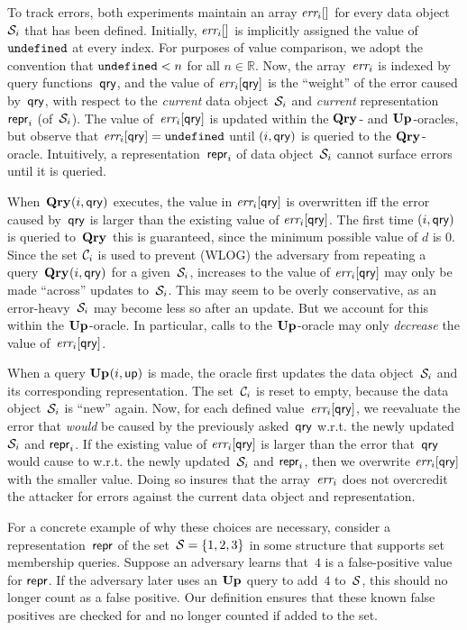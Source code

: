 To track errors, both experiments maintain an array $\textit{err}_i[]$ for every data object~$\mathcal{S}_i$ that has been defined.   Initially, $\textit{err}_i[]$ is implicitly assigned the value of~$\mathtt{undefined}$ at every index.  For purposes of value comparison, we adopt the convention that $\mathtt{undefined} < n$ for all $n \in \mathbb{R}$.
%
Now, the array~$\textit{err}_i$ is indexed by query functions~$\mathsf{qry}$, and the value of $\textit{err}_i[\mathsf{qry}]$ is the ``weight'' of the error caused by~$\mathsf{qry}$, with respect to the \emph{current} data object~$\mathcal{S}_i$ and \emph{current} representation~$\mathsf{repr}_i$ (of~$\mathcal{S}_i$).  
%
The value of~$\textit{err}_i[\mathsf{qry}]$ is updated within the $\mathbf{Qry}\hspace{0.5pt}$- and $\mathbf{Up}\hspace{0.5pt}$-oracles, but observe that $\textit{err}_i[\mathsf{qry}] = \mathtt{undefined}$ until $(i,\mathsf{qry})$ is queried to the $\mathbf{Qry}\hspace{0.5pt}$-oracle.  Intuitively, a representation~$\mathsf{repr}_i$ of data object~$\mathcal{S}_i$ cannot surface errors until it is queried.

When~$\mathbf{Qry}\hspace{0.5pt}(i,\mathsf{qry})$ executes, the value in $\textit{err}_i[\mathsf{qry}]$ is overwritten iff the error caused by~$\mathsf{qry}$ is larger than the existing value of $\textit{err}_i[\mathsf{qry}]$.  The first time $(i,\mathsf{qry})$ is queried to~$\mathbf{Qry}\hspace{0.5pt}$ this is guaranteed, since the minimum possible value of $d$ is 0.  Since the set $\mathcal{C}_i$ is used to prevent (WLOG) the adversary from repeating a query~$\mathbf{Qry}\hspace{0.5pt}(i,\mathsf{qry})$ for a given~$\mathcal{S}_i$, increases to the value of $\textit{err}_i[\mathsf{qry}]$ may only be made ``across'' updates to~$\mathcal{S}_i$.  This may seem to be overly conservative, as an error-heavy~$\mathcal{S}_i$ may become less so after an update.  But we account for this within the $\mathbf{Up}\hspace{0.5pt}$-oracle.
In particular, calls to the $\mathbf{Up}\hspace{0.5pt}$-oracle may only \emph{decrease} the value of~$\textit{err}_i[\mathsf{qry}]$.  

When a query $\mathbf{Up}\hspace{0.5pt}(i,\mathsf{up})$ is made, the oracle first updates the data object~$\mathcal{S}_i$ and its corresponding representation.  The set~$\mathcal{C}_i$ is reset to empty, because the data object~$\mathcal{S}_i$ is ``new'' again.
%
Now, for each defined value~$\textit{err}_i[\mathsf{qry}]$, we reevaluate the error that \emph{would} be caused by the previously asked~$\mathsf{qry}$ w.r.t. the newly updated $\mathcal{S}_i$ and $\mathsf{repr}_i$.  If the existing value of $\textit{err}_i[\mathsf{qry}]$ is larger than the error that~$\mathsf{qry}$ would cause to w.r.t. the newly updated~$\mathcal{S}_i$ and $\mathsf{repr}_i$, then we overwrite $\textit{err}_i[\mathsf{qry}]$ with the smaller value.  Doing so insures that the array~$\textit{err}_i$ does not overcredit the attacker for errors against the current data object and representation.

For a concrete example of why these choices are necessary, consider a representation~$\mathsf{repr}$ of the set~$\mathcal{S} = \{1,2,3\}$ in some structure that supports set membership queries. Suppose an adversary learns that~$4$ is a false-positive value for $\mathsf{repr}$. If the adversary later uses an $\mathbf{Up}\hspace{0.5pt}$ query to add~$4$ to~$\mathcal{S}$, this should no longer count as a false positive. Our definition ensures that these known false positives are checked for and no longer counted if added to the set.


